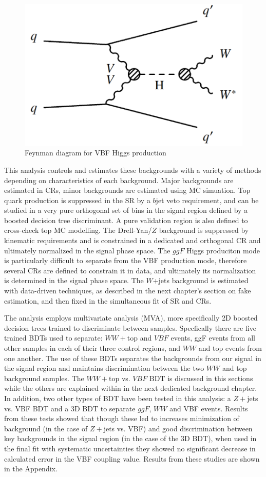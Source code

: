 \begin{figure}[!htbp]
    \centering
    \includegraphics[width=0.2\linewidth]{Pictures/fig_01b_2.pdf}
    \caption{Feynman diagram for VBF Higgs production}
    \label{fig:FeynmanDiagram}
\end{figure}

This analysis controls and estimates these backgrounds with a variety of methods depending on characteristics of each background. Major backgrounds are estimated in CRs, minor backgrounds are estimated using MC simuation. Top quark production is suppressed in the SR by a $b$jet veto requirement, and can be studied in a very pure orthogonal set of bins in the signal region defined by a boosted decision tree discriminant. A pure validation region is also defined to cross-check top MC modelling. The Drell-Yan/$Z$ background is suppressed by kinematic requirements and is constrained in a dedicated and orthogonal CR and ultimately normalized in the signal phase space. The $ggF$ Higgs produciton mode is particularly difficult to separate from the VBF production mode, therefore several CRs are defined to constrain it in data, and ultimately its normalization is determined in the signal phase space. The $W$+jets background is estimated with data-driven techniques, as described in the next chapter's section on fake estimation, and then fixed in the simultaneous fit of SR and CRs.

The analysis employs multivariate analysis (MVA), more specifically 2D boosted decision trees trained to discriminate between samples. Specfically there are five trained BDTs used to separate: $WW+$top and $VBF$ events, ggF events from all other samples in each of their three control regions, and $WW$ and top events from one another. The use of these BDTs separates the backgrounds from our signal in the signal region and maintains discrimination between the two $WW$ and top background samples. The  $WW+$top vs. $VBF$ BDT is discussed in this sections while the others are explained within in the next dedicated background chapter. In addition, two other types of BDT have been tested in this analysis: a $Z+$jets vs. VBF BDT and a 3D BDT to separate $ggF$, $WW$ and VBF events. Results from these tests showed that though these led to increases minimization of background (in the case of $Z+$jets vs. VBF) and good discrimination between key backgrounds in the signal region (in the case of the 3D BDT), when used in the final fit with systematic uncertainties they showed no significant decrease in calculated error in the VBF coupling value. Results from these studies are shown in the Appendix. 

